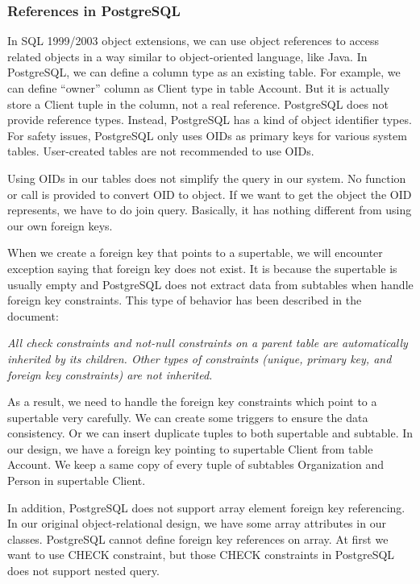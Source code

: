 \documentclass[11pt]{article}
\begin{document}
\subsubsection{References in PostgreSQL}
\label{sec:refinpgsql}
\par
In SQL 1999/2003 object extensions, we can use object references to access related objects in a way similar to object-oriented language, like Java. In PostgreSQL, we can define a column type as an existing table. For example, we can define ``owner'' column as Client type in table Account. But it is actually store a Client tuple in the column, not a real reference. PostgreSQL does not provide reference types. Instead, PostgreSQL has a kind of object identifier types. For safety issues, PostgreSQL only uses OIDs as primary keys for various system tables. User-created tables are not recommended to use OIDs.
\par
Using OIDs in our tables does not simplify the query in our system. No function or call is provided to convert OID to object. If we want to get the object the OID represents, we have to do join query. Basically, it has nothing different from using our own foreign keys.
\par
When we create a foreign key that points to a supertable, we will encounter exception saying that foreign key does not exist. It is because the supertable is usually empty and PostgreSQL does not extract data from subtables when handle foreign key constraints. This type of behavior has been described in the document:
\par
\emph{All check constraints and not-null constraints on a parent table are automatically inherited by its children. Other types of constraints (unique, primary key, and foreign key constraints) are not inherited.}
\par
As a result, we need to handle the foreign key constraints which point to a supertable very carefully. We can create some triggers to ensure the data consistency. Or we can insert duplicate tuples to both supertable and subtable. In our design, we have a foreign key pointing to supertable Client from table Account. We keep a same copy of every tuple of subtables Organization and Person in supertable Client.
\par
In addition, PostgreSQL does not support array element foreign key referencing. In our original object-relational design, we have some array attributes in our classes. PostgreSQL cannot define foreign key references on array. At first we want to use CHECK constraint, but those CHECK constraints in PostgreSQL does not support nested query.
\end{document}
